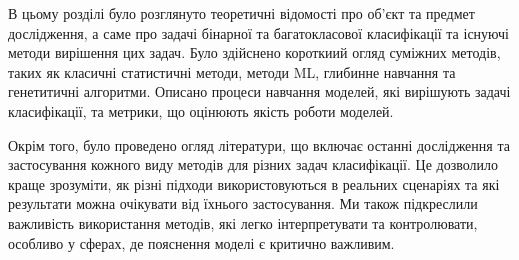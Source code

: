\chapconclude{\ref{chap:review}}

В цьому розділі було розглянуто теоретичні відомості про об'єкт та предмет дослідження, а саме про задачі бінарної та багатокласової класифікації та існуючі методи вирішення цих задач. Було здійснено короткиий огляд суміжних методів, таких як класичні статистичні методи, методи ML, глибинне навчання та генетитичні алгоритми. Описано процеси навчання моделей, які вирішують задачі класифікації, та метрики, що оцінюють якість роботи моделей.

Окрім того, було проведено огляд літератури, що включає останні дослідження та застосування кожного виду методів для різних задач класифікації. Це дозволило краще зрозуміти, як різні підходи використовуються в реальних сценаріях та які результати можна очікувати від їхнього застосування. Ми також підкреслили важливість використання методів, які легко інтерпретувати та контролювати, особливо у сферах, де пояснення моделі є критично важливим.